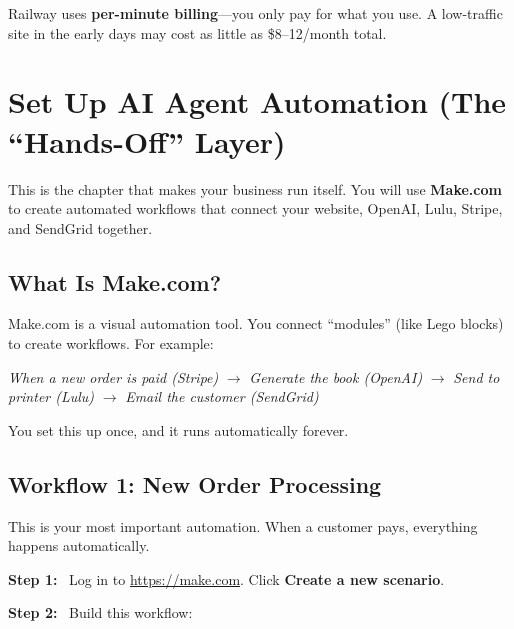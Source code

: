 \documentclass[12pt, letterpaper, oneside]{book}
\newcommand{\step}[1]{\noindent\textbf{\textcolor{primary}{Step #1:}}~}
\begin{document}
\begin{infobox}
Railway uses \textbf{per-minute billing}---you only pay for what you use. A low-traffic site in the early days may cost as little as \$8--12/month total.
\end{infobox}

\chapter{Set Up AI Agent Automation (The ``Hands-Off'' Layer)}

This is the chapter that makes your business run itself. You will use \textbf{Make.com} to create automated workflows that connect your website, OpenAI, Lulu, Stripe, and SendGrid together.

\section{What Is Make.com?}

Make.com is a visual automation tool. You connect ``modules'' (like Lego blocks) to create workflows. For example:

\begin{center}
\textit{When a new order is paid (Stripe)} $\rightarrow$ \textit{Generate the book (OpenAI)} $\rightarrow$ \textit{Send to printer (Lulu)} $\rightarrow$ \textit{Email the customer (SendGrid)}
\end{center}

You set this up once, and it runs automatically forever.

\section{Workflow 1: New Order Processing}

This is your most important automation. When a customer pays, everything happens automatically.

\step{1} Log in to \url{https://make.com}. Click \textbf{Create a new scenario}.

\step{2} Build this workflow:
\end{document}
